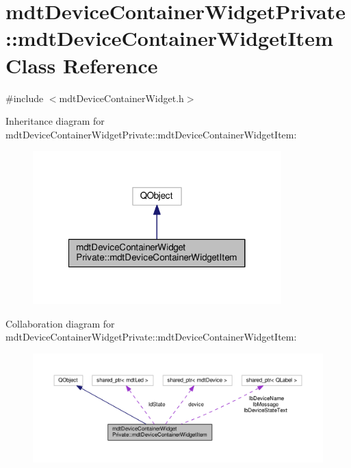 \hypertarget{classmdt_device_container_widget_private_1_1mdt_device_container_widget_item}{\section{mdt\-Device\-Container\-Widget\-Private\-:\-:mdt\-Device\-Container\-Widget\-Item Class Reference}
\label{classmdt_device_container_widget_private_1_1mdt_device_container_widget_item}
}


{\ttfamily \#include $<$mdt\-Device\-Container\-Widget.\-h$>$}



Inheritance diagram for mdt\-Device\-Container\-Widget\-Private\-:\-:mdt\-Device\-Container\-Widget\-Item\-:
\nopagebreak
\begin{figure}[H]
\begin{center}
\leavevmode
\includegraphics[width=272pt]{classmdt_device_container_widget_private_1_1mdt_device_container_widget_item__inherit__graph}
\end{center}
\end{figure}


Collaboration diagram for mdt\-Device\-Container\-Widget\-Private\-:\-:mdt\-Device\-Container\-Widget\-Item\-:
\nopagebreak
\begin{figure}[H]
\begin{center}
\leavevmode
\includegraphics[width=350pt]{classmdt_device_container_widget_private_1_1mdt_device_container_widget_item__coll__graph}
\end{center}
\end{figure}
